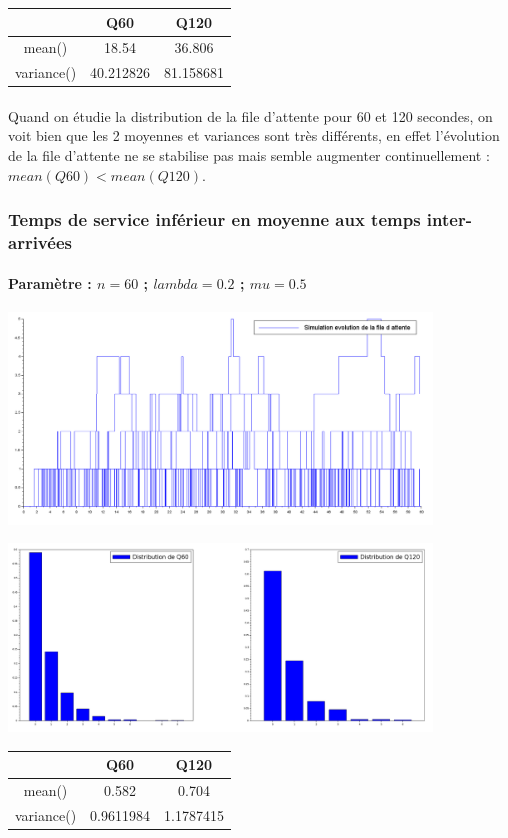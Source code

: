 \documentclass{article}
\begin{document}
\begin{center}
	\begin{tabular}{c|cc}
		\hline \hline
		& Q60 & Q120 \\
		\hline
		mean() & 18.54 & 36.806 \\
		variance() & 40.212826 & 81.158681 \\
		\hline \hline
	\end{tabular}
\end{center}
\paragraph{}
Quand on étudie la distribution de la file d'attente pour 60 et 120 secondes, on voit bien que les 2 moyennes et variances sont très différents, en effet l'évolution de la file d'attente ne se stabilise pas mais semble augmenter continuellement : $ mean(Q60)<mean(Q120)$.

\subsubsection{Temps de service inférieur en moyenne aux temps inter-arrivées}
\paragraph{Paramètre : $n=60$ ; $lambda=0.2$ ; $mu=0.5$}
\begin{center}
	\includegraphics[width=425px]{img/sup.PNG}
\end{center}
\begin{center}
	\includegraphics[width=425px]{img/inf/dist.png}
\end{center}
\begin{center}
	\begin{tabular}{c|cc}
		\hline \hline
		& Q60 & Q120 \\
		\hline
		mean() & 0.582 & 0.704 \\
		variance() & 0.9611984 & 1.1787415 \\
		\hline \hline
	\end{tabular}
\end{center}
\end{document}

